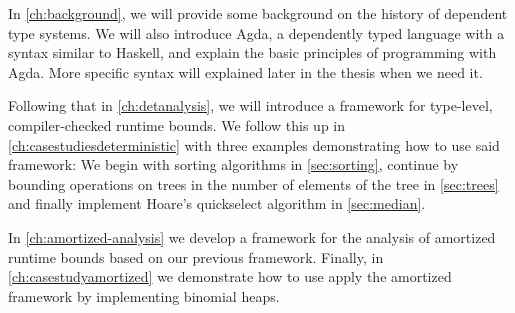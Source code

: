 In \autoref{ch:background}, we will provide some background on the history of dependent type systems. We will also introduce Agda, a dependently typed language with a syntax similar to Haskell, and explain the basic principles of programming with Agda. More specific syntax will explained later in the thesis when we need it.

Following that in \autoref{ch:detanalysis}, we will introduce a framework for type-level, compiler-checked runtime bounds. We follow this up in \autoref{ch:casestudiesdeterministic} with three examples demonstrating how to use said framework: We begin with sorting algorithms in \autoref{sec:sorting}, continue by bounding operations on trees in the number of elements of the tree in \autoref{sec:trees} and finally implement Hoare's quickselect algorithm in \autoref{sec:median}.

In \autoref{ch:amortized-analysis} we develop a framework for the analysis of amortized runtime bounds based on our previous framework. Finally, in \autoref{ch:casestudyamortized} we demonstrate how to use apply the amortized framework by implementing binomial heaps.